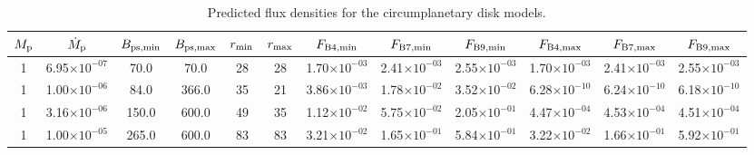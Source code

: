 
\begin{table}
    \caption{Predicted flux densities for the circumplanetary disk models.}
    \label{tab:model_fluxes}
    \centering
\begin{tabular}{cccccccccccc}
\toprule
$M_{\rm p}$ & $\dot{M}_{\rm p}$ & $B_{\rm ps,min}$ & $B_{\rm ps,max}$ & $r_{\rm min}$ & $r_{\rm max}$ & $F_{\rm B4,min}$ & $F_{\rm B7,min}$ & $F_{\rm B9,min}$ & $F_{\rm B4,max}$ & $F_{\rm B7,max}$ & $F_{\rm B9,max}$ \\
\midrule
1 & 6.95$\times 10^{-07}$ & 70.0 & 70.0 & 28 & 28 & 1.70$\times 10^{-03}$ & 2.41$\times 10^{-03}$ & 2.55$\times 10^{-03}$ & 1.70$\times 10^{-03}$ & 2.41$\times 10^{-03}$ & 2.55$\times 10^{-03}$ \\
1 & 1.00$\times 10^{-06}$ & 84.0 & 366.0 & 35 & 21 & 3.86$\times 10^{-03}$ & 1.78$\times 10^{-02}$ & 3.52$\times 10^{-02}$ & 6.28$\times 10^{-10}$ & 6.24$\times 10^{-10}$ & 6.18$\times 10^{-10}$ \\
1 & 3.16$\times 10^{-06}$ & 150.0 & 600.0 & 49 & 35 & 1.12$\times 10^{-02}$ & 5.75$\times 10^{-02}$ & 2.05$\times 10^{-01}$ & 4.47$\times 10^{-04}$ & 4.53$\times 10^{-04}$ & 4.51$\times 10^{-04}$ \\
1 & 1.00$\times 10^{-05}$ & 265.0 & 600.0 & 83 & 83 & 3.21$\times 10^{-02}$ & 1.65$\times 10^{-01}$ & 5.84$\times 10^{-01}$ & 3.22$\times 10^{-02}$ & 1.66$\times 10^{-01}$ & 5.92$\times 10^{-01}$ \\
\bottomrule
\end{tabular}

\end{table}
